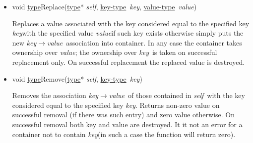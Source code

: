 \documentclass[a4paper]{article}
\newcommand{\st}{\underline{type}}
\newcommand{\kt}{\underline{key-type}}
\newcommand{\vt}{\underline{value-type}}
\newcommand{\sv}{\emph{self}}
\newcommand{\kv}{\emph{key}}
\newcommand{\vv}{\emph{value}}
\newcommand{\meth}[1]{#1}
\begin{document}
\begin{itemize}
\item \meth{void \st Replace(\st* \sv, \kt\ \kv, \vt\ \vv)}


Replaces a value associated with the key considered equal to the specified key \kv with the specified value \vv if such key exists otherwise simply puts the new \kv$\rightarrow$\vv\ association into container.
In any case the container takes ownership over \vv; the ownership over \kv\ is taken on successful replacement only.
On successful replacement the replaced value is destroyed.


\item \meth{void \st Remove(\st* \sv, \kt\ \kv)}


Removes the association \kv$\rightarrow$\vv\ of those contained in \sv\ with the key considered equal to the specified key \kv. 
Returns non-zero value on successful removal (if there was such entry) and zero value otherwise.
On successful removal both key and value are destroyed.
It it not an error for a container not to contain \kv (in such a case the function will return zero).


\end{itemize}
\end{document}
